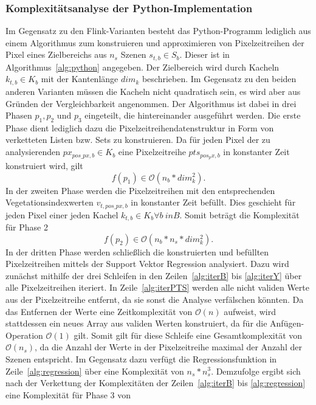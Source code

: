 \subsubsection{Komplexitätsanalyse der Python-Implementation}
\label{subsec:complexityPython}
Im Gegensatz zu den Flink-Varianten besteht das Python-Programm lediglich aus einem Algorithmus zum konstruieren und approximieren von Pixelzeitreihen der Pixel eines Zielbereichs aus $n_s$ Szenen $s_{t, b} \in S_b$. Dieser ist in Algorithmus~\ref{alg:python} angegeben. Der Zielbereich wird durch Kacheln $k_{t, b} \in K_{b}$ mit der Kantenlänge $dim_k$ beschrieben. Im Gegensatz zu den beiden anderen Varianten müssen die Kacheln nicht quadratisch sein, es wird aber aus Gründen der Vergleichbarkeit angenommen. Der Algorithmus ist dabei in drei Phasen $p_1, p_2$ und $p_3$ eingeteilt, die hintereinander ausgeführt werden. Die erste Phase dient lediglich dazu die Pixelzeitreihendatenstruktur in Form von verketteten Listen bzw. Sets zu konstruieren. Da für jeden Pixel der zu analysierenden $px_{pos\_px, b} \in K_{b}$ eine Pixelzeitreihe $pts_{pos_px, b}$ in konstanter Zeit konstruiert wird, gilt  
%
\begin{equation} \label{eq:complexityPython1}
f(p_1) \in \mathcal{O}(n_b * dim_k^2).
\end{equation}
%
In der zweiten Phase werden die Pixelzeitreihen mit den entsprechenden Vegetationsindexwerten $v_{t, pos\_px, b}$ in konstanter Zeit befüllt. Dies geschieht für jeden Pixel einer jeden Kachel $k_{t, b} \in K_b \forall b\ in B$. Somit beträgt die Komplexität für Phase 2 
% 
\begin{equation} \label{eq:complexityPython2}
f(p_2) \in \mathcal{O}(n_b * n_s * dim_k^2).
\end{equation}
% 
In der dritten Phase werden schließlich die konstruierten und befüllten Pixelzeitreihen mittels der Support Vektor Regression analysiert. Dazu wird zunächst mithilfe der drei Schleifen in den Zeilen~\ref{alg:iterB} bis \ref{alg:iterY} über alle Pixelzeitreihen iteriert. In Zeile~\ref{alg:iterPTS} werden alle nicht validen Werte aus der Pixelzeitreihe entfernt, da sie sonst die Analyse verfälschen könnten. Da das Entfernen der Werte eine Zeitkomplexität von $\mathcal{O}(n)$ aufweist, wird stattdessen ein neues Array aus validen Werten konstruiert, da für die Anfügen-Operation $\mathcal{O}(1)$ gilt. Somit gilt für diese Schleife eine Gesamtkomplexität von $\mathcal{O}(n_s)$, da die Anzahl der Werte in der Pixelzeitreihe maximal der Anzahl der Szenen entspricht. Im Gegensatz dazu verfügt die Regressionsfunktion in Zeile~\ref{alg:regression} über eine Komplexität von $n_s * n_s^3$. Demzufolge ergibt sich nach der Verkettung der Komplexitäten der Zeilen~\ref{alg:iterB} bis \ref{alg:regression} eine Komplexität für Phase 3 von 
